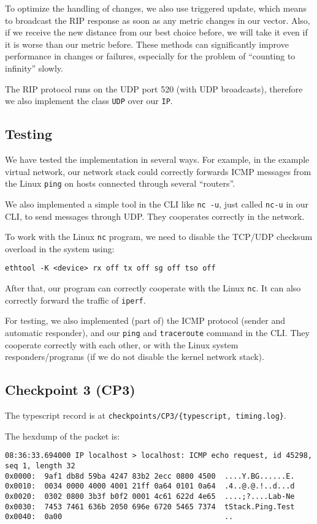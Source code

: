 \documentclass[a4paper]{article}
\begin{document}
  To optimize the handling of changes, we also use triggered update, which means to broadcast the RIP response as soon as any metric changes in our vector.
  Also, if we receive the new distance from our best choice before, we will take it even if it is worse than our metric before. These methods can significantly improve performance in changes or failures, especially for the problem of ``counting to infinity'' slowly.

  The RIP protocol runs on the UDP port 520 (with UDP broadcasts), therefore we also implement the class \texttt{UDP} over our \texttt{IP}.

  \subsection{Testing}

  We have tested the implementation in several ways. For example, in the example virtual network, our network stack could correctly forwards ICMP messages from the Linux \texttt{ping} on hosts connected through several ``routers''.
  
  We also implemented a simple tool in the CLI like \texttt{nc -u}, just called \texttt{nc-u} in our CLI, to send messages through UDP. They cooperates correctly in the network.

  To work with the Linux \texttt{nc} program, we need to disable the TCP/UDP checksum overload in the system using:
  \begin{verbatim}
ethtool -K <device> rx off tx off sg off tso off
  \end{verbatim}
  After that, our program can correctly cooperate with the Linux \texttt{nc}.
  It can also correctly forward the traffic of \texttt{iperf}.

  For testing, we also implemented (part of) the ICMP protocol (sender and automatic responder), and our \texttt{ping} and \texttt{traceroute} command in the CLI.
  They cooperate correctly with each other, or with the Linux system responders/programs (if we do not disable the kernel network stack).

  \subsection{Checkpoint 3 (CP3)}

  The typescript record is at \texttt{checkpoints/CP3/\{typescript, timing.log\}}.

  The hexdump of the packet is:
  \begin{verbatim}
08:36:33.694000 IP localhost > localhost: ICMP echo request, id 45298, seq 1, length 32
0x0000:  9af1 db8d 59ba 4247 83b2 2ecc 0800 4500  ....Y.BG......E.
0x0010:  0034 0000 4000 4001 21ff 0a64 0101 0a64  .4..@.@.!..d...d
0x0020:  0302 0800 3b3f b0f2 0001 4c61 622d 4e65  ....;?....Lab-Ne
0x0030:  7453 7461 636b 2050 696e 6720 5465 7374  tStack.Ping.Test
0x0040:  0a00                                     ..
  \end{verbatim}
\end{document}
